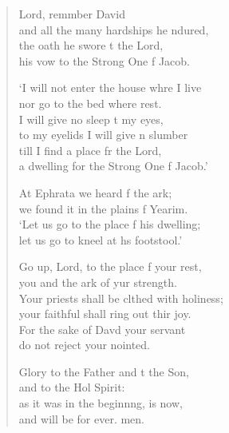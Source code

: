 \settowidth{\versewidth}{Your priests shall be clothed with holiness; *}
\begin{verse}%
  \begin{patverse}
 Lord, remmber David\Med\\
    and all the many hardships he ndured,\\
the oath he swore t the Lord,\Med\\
    his vow to the Strong One f Jacob.

‘I will not enter the house whre I live\Med\\
    nor go to the bed where  rest.\\
I will give no sleep t my eyes,\Med\\
    to my eyelids I will give n slumber\\
till I find a place fr the Lord,\Med\\
    a dwelling for the Strong One f Jacob.’

At Ephrata we heard f the ark;\Med\\
    we found it in the plains f Yearim.\\
‘Let us go to the place f his dwelling;\Med\\
    let us go to kneel at h\pointup{\i}s footstool.’

Go up, Lord, to the place f your rest,\Med\\
    you and the ark of yur strength.\\
Your priests shall be clthed with holiness;\Med\\
    your faithful shall ring out thir joy.\\
For the sake of Dav\pointup{\i}d your servant\Med\\
    do not reject your nointed.

Glory to the Father and t the Son,\Med\\
    and to the Hol Spirit:\\
as it was in the beginn\pointup{\i}ng, is now,\Med\\
    and will be for ever. men.
  \end{patverse}
\end{verse}
